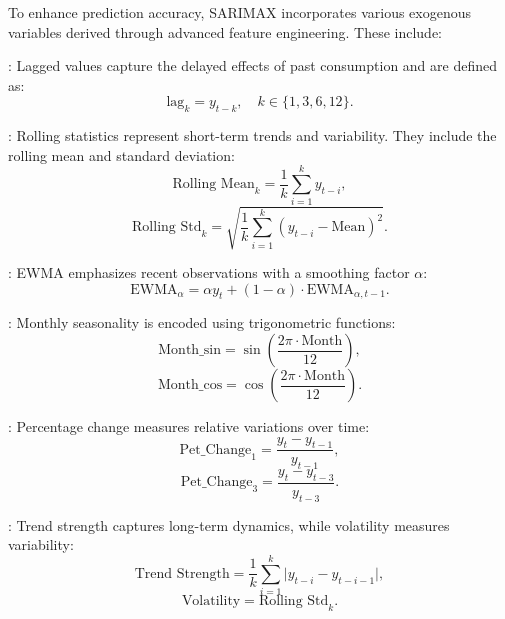 \documentclass[journal]{IEEEtran}
\begin{document}
To enhance prediction accuracy, SARIMAX incorporates various exogenous variables derived through advanced feature engineering. These include:

:  
Lagged values capture the delayed effects of past consumption and are defined as:
\begin{equation}
\text{lag}_{k} = y_{t-k}, \quad k \in \{1, 3, 6, 12\}.
\end{equation}

:  
Rolling statistics represent short-term trends and variability. They include the rolling mean and standard deviation:
\begin{equation}
\text{Rolling Mean}_{k} = \frac{1}{k} \sum_{i=1}^{k} y_{t-i},
\end{equation}
\begin{equation}
\text{Rolling Std}_{k} = \sqrt{\frac{1}{k} \sum_{i=1}^{k} (y_{t-i} - \text{Mean})^2}.
\end{equation}

:  
EWMA emphasizes recent observations with a smoothing factor \(\alpha\):
\begin{equation}
\text{EWMA}_{\alpha} = \alpha y_{t} + (1-\alpha) \cdot \text{EWMA}_{\alpha,t-1}.
\end{equation}

:  
Monthly seasonality is encoded using trigonometric functions:
\begin{equation}
\text{Month\_sin} = \sin\left(\frac{2\pi \cdot \text{Month}}{12}\right),
\end{equation}
\begin{equation}
\text{Month\_cos} = \cos\left(\frac{2\pi \cdot \text{Month}}{12}\right).
\end{equation}

:  
Percentage change measures relative variations over time:
\begin{equation}
\text{Pet\_Change}_{1} = \frac{y_{t} - y_{t-1}}{y_{t-1}},
\end{equation}
\begin{equation}
\text{Pet\_Change}_{3} = \frac{y_{t} - y_{t-3}}{y_{t-3}}.
\end{equation}

:  
Trend strength captures long-term dynamics, while volatility measures variability:
\begin{equation}
\text{Trend Strength} = \frac{1}{k} \sum_{i=1}^{k} \lvert y_{t-i} - y_{t-i-1} \rvert,
\end{equation}
\begin{equation}
\text{Volatility} = \text{Rolling Std}_{k}.
\end{equation}
\end{document}
